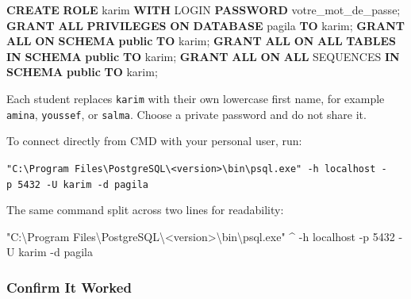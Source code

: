 \documentclass[
  letterpaper,
  DIV=11,
  numbers=noendperiod]{scrartcl}
\newenvironment{Shaded}{\begin{snugshade}}{\end{snugshade}}
\newcommand{\AttributeTok}[1]{\textcolor[rgb]{0.40,0.45,0.13}{#1}}
\newcommand{\KeywordTok}[1]{\textcolor[rgb]{0.00,0.23,0.31}{\textbf{#1}}}
\newcommand{\NormalTok}[1]{\textcolor[rgb]{0.00,0.23,0.31}{#1}}
\newcommand{\StringTok}[1]{\textcolor[rgb]{0.13,0.47,0.30}{#1}}
\begin{document}
\begin{Shaded}
\begin{Highlighting}[]
\KeywordTok{CREATE} \KeywordTok{ROLE}\NormalTok{ karim }\KeywordTok{WITH}\NormalTok{ LOGIN }\KeywordTok{PASSWORD} \StringTok{\textquotesingle{}votre\_mot\_de\_passe\textquotesingle{}}\NormalTok{;}
\KeywordTok{GRANT} \KeywordTok{ALL} \KeywordTok{PRIVILEGES} \KeywordTok{ON} \KeywordTok{DATABASE}\NormalTok{ pagila }\KeywordTok{TO}\NormalTok{ karim;}
\KeywordTok{GRANT} \KeywordTok{ALL} \KeywordTok{ON} \KeywordTok{SCHEMA} \KeywordTok{public} \KeywordTok{TO}\NormalTok{ karim;}
\KeywordTok{GRANT} \KeywordTok{ALL} \KeywordTok{ON} \KeywordTok{ALL} \KeywordTok{TABLES} \KeywordTok{IN} \KeywordTok{SCHEMA} \KeywordTok{public} \KeywordTok{TO}\NormalTok{ karim;}
\KeywordTok{GRANT} \KeywordTok{ALL} \KeywordTok{ON} \KeywordTok{ALL}\NormalTok{ SEQUENCES }\KeywordTok{IN} \KeywordTok{SCHEMA} \KeywordTok{public} \KeywordTok{TO}\NormalTok{ karim;}
\end{Highlighting}
\end{Shaded}

Each student replaces \texttt{karim} with their own lowercase first
name, for example \texttt{amina}, \texttt{youssef}, or \texttt{salma}.
Choose a private password and do not share it.

To connect directly from CMD with your personal user, run:

\texttt{"C:\textbackslash{}Program\ Files\textbackslash{}PostgreSQL\textbackslash{}\textless{}version\textgreater{}\textbackslash{}bin\textbackslash{}psql.exe"\ -h\ localhost\ -p\ 5432\ -U\ karim\ -d\ pagila}

The same command split across two lines for readability:

\begin{Shaded}
\begin{Highlighting}[]
\StringTok{"C:\textbackslash{}Program Files\textbackslash{}PostgreSQL\textbackslash{}\textless{}version\textgreater{}\textbackslash{}bin\textbackslash{}psql.exe"}\NormalTok{ \^{}}
\NormalTok{  {-}h localhost }\AttributeTok{{-}p}\NormalTok{ 5432 }\AttributeTok{{-}U}\NormalTok{ karim }\AttributeTok{{-}d}\NormalTok{ pagila}
\end{Highlighting}
\end{Shaded}

\subsubsection{Confirm It Worked}\label{confirm-it-worked}
\end{document}
